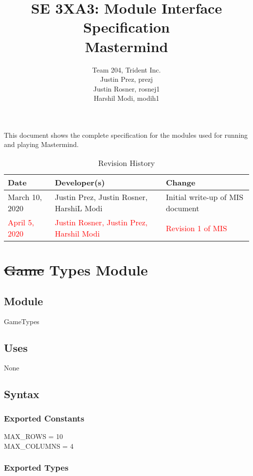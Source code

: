 \documentclass[12pt]{article}
\title{SE 3XA3: Module Interface Specification\\Mastermind}
\author{Team 204, Trident Inc.
		\\ Justin Prez, prezj
		\\ Justin Rosner, rosnej1
		\\ Harshil Modi, modih1
}
\begin{document}
 
\maketitle

This document shows the complete specification for the modules used for running and playing Mastermind.


\newpage

\begin{table}[hp]
\caption{Revision History} \label{TblRevisionHistory}
\begin{tabularx}{\textwidth}{llX}
\toprule
\textbf{Date} & \textbf{Developer(s)} & \textbf{Change}\\
\midrule
March 10, 2020 & Justin Prez, Justin Rosner, HarshiL Modi & Initial write-up of MIS document\\
\textcolor{red}{April 5, 2020} & \textcolor{red}{Justin Rosner, Justin Prez, Harshil Modi} & \textcolor{red}{Revision 1 of MIS}\\
\bottomrule
\end{tabularx}
\end{table}

\newpage


\section* {\sout{Game} Types Module}

\subsection*{Module}

GameTypes

\subsection* {Uses}

None

\subsection* {Syntax}

\subsubsection* {Exported Constants}

MAX\_ROWS = 10\\
MAX\_COLUMNS = 4


\subsubsection* {Exported Types}
\end{document}
